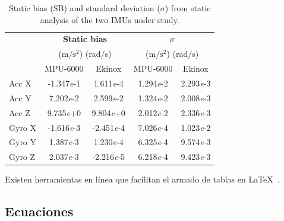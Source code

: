 \documentclass{article}
\begin{document}
\begin{table}[ht]

\small
	\centering
	\caption{Static bias (SB) and standard deviation ($\sigma$) from static analysis of the two IMUs under study.}
	\label{tab:IMU-static}
	\begin{tabular}{l cc cc}

	\toprule %

	&  \multicolumn{2}{c}{ \textbf{Static bias} } &  \multicolumn{2}{c}{ \textbf{$\sigma$}} \\

    &  \multicolumn{2}{c}{(m$/\text{s}^2$) (rad$/$s) }   &  \multicolumn{2}{c}{(m$/\text{s}^2$) (rad$/$s) } \\

	\midrule

	&  {MPU-6000} & Ekinox &  {MPU-6000} & Ekinox \\

	\midrule

 Acc X      & -1.347\emph{e}-1  	& 1.611\emph{e}-4  	& 1.294\emph{e}-2 	& 2.293\emph{e}-3 \\

 Acc Y      & 7.202\emph{e}-2  	& 2.599\emph{e}-2  	& 1.324\emph{e}-2 	& 2.008\emph{e}-3  \\

 Acc Z     	& 9.735\emph{e}+0   	& 9.804\emph{e}+0 	& 2.012\emph{e}-2  	& 2.336\emph{e}-3 \\

 Gyro X     & -1.616\emph{e}-3 	&-2.451\emph{e}-4  	& 7.026\emph{e}-4   	& 1.023\emph{e}-2 \\

 Gyro Y  	& 1.387\emph{e}-3   	& 1.230\emph{e}-4 	& 6.325\emph{e}-4  	& 9.574\emph{e}-3 \\

 Gyro Z  	& 2.037\emph{e}-3   	& -2.216\emph{e}-5	& 6.218\emph{e}-4   	& 9.423\emph{e}-3 \\

	\bottomrule

\end{tabular}
\end{table}

Existen herramientas en línea que facilitan el armado de tablas en \LaTeX $\,$ \cite{TableGenerator}.

\subsection{Ecuaciones}
\end{document}
